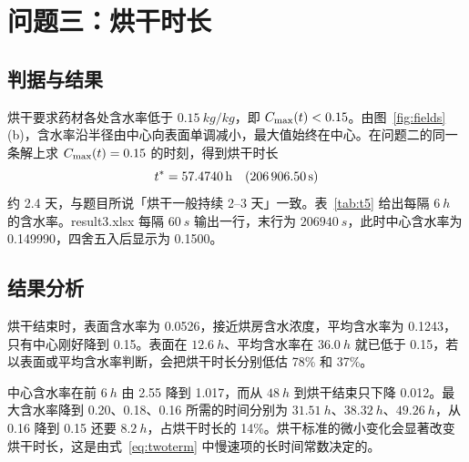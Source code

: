 \section{问题三：烘干时长}\label{sec:q3}

\subsection{判据与结果}

烘干要求药材各处含水率低于 $\SI{0.15}{kg/kg}$，即 $C_{\max}(t)<0.15$。由图~\ref{fig:fields}(b)，含水率沿半径由中心向表面单调减小，最大值始终在中心。在问题二的同一条解上求 $C_{\max}(t)=0.15$ 的时刻，得到烘干时长
\begin{equation}
t^{*}=\SI{57.4740}{h}\quad(\SI{206906.50}{s})
\end{equation}
约 2.4 天，与题目所说「烘干一般持续 2--3 天」一致。表~\ref{tab:t5} 给出每隔 $\SI{6}{h}$ 的含水率。result3.xlsx 每隔 $\SI{60}{s}$ 输出一行，末行为 $\SI{206940}{s}$，此时中心含水率为 0.149990，四舍五入后显示为 0.1500。

\begin{table}[htbp]\centering\small
\caption{药材烘干过程的水分浓度（\si{kg/kg}）}\label{tab:t5}

\end{table}

\subsection{结果分析}

 烘干结束时，表面含水率为 0.0526，接近烘房含水浓度，平均含水率为 0.1243，只有中心刚好降到 0.15。表面在 $\SI{12.6}{h}$、平均含水率在 $\SI{36.0}{h}$ 就已低于 0.15，若以表面或平均含水率判断，会把烘干时长分别低估 78\% 和 37\%。

 中心含水率在前 $\SI{6}{h}$ 由 2.55 降到 1.017，而从 $\SI{48}{h}$ 到烘干结束只下降 0.012。最大含水率降到 0.20、0.18、0.16 所需的时间分别为 $\SI{31.51}{h}$、$\SI{38.32}{h}$、$\SI{49.26}{h}$，从 0.16 降到 0.15 还要 $\SI{8.2}{h}$，占烘干时长的 14\%。烘干标准的微小变化会显著改变烘干时长，这是由式~\eqref{eq:twoterm} 中慢速项的长时间常数决定的。
